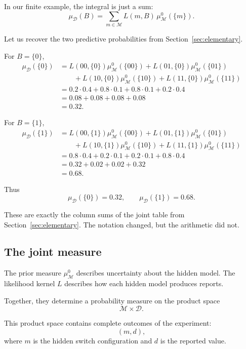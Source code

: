 \documentclass[11pt]{article}
\newcommand{\M}{\mathcal{M}}
\newcommand{\D}{\mathcal{D}}
\newcommand{\muMzero}{\mu^0_{\M}}
\newcommand{\muD}{\mu_{\D}}
\begin{document}
In our finite example, the integral is just a sum:
\[
    \muD(B)
    =
    \sum_{m\in\M} L(m,B)\,\muMzero(\{m\}).
\]

Let us recover the two predictive probabilities from Section~\ref{sec:elementary}.

For \(B=\{0\}\),
\[
\begin{aligned}
    \muD(\{0\})
    &=
    L(00,\{0\})\muMzero(\{00\})
    +
    L(01,\{0\})\muMzero(\{01\})
    \\
    &\qquad
    +
    L(10,\{0\})\muMzero(\{10\})
    +
    L(11,\{0\})\muMzero(\{11\})
    \\
    &=
    0.2\cdot 0.4
    +
    0.8\cdot 0.1
    +
    0.8\cdot 0.1
    +
    0.2\cdot 0.4
    \\
    &=
    0.08+0.08+0.08+0.08
    \\
    &=
    0.32.
\end{aligned}
\]

For \(B=\{1\}\),
\[
\begin{aligned}
    \muD(\{1\})
    &=
    L(00,\{1\})\muMzero(\{00\})
    +
    L(01,\{1\})\muMzero(\{01\})
    \\
    &\qquad
    +
    L(10,\{1\})\muMzero(\{10\})
    +
    L(11,\{1\})\muMzero(\{11\})
    \\
    &=
    0.8\cdot 0.4
    +
    0.2\cdot 0.1
    +
    0.2\cdot 0.1
    +
    0.8\cdot 0.4
    \\
    &=
    0.32+0.02+0.02+0.32
    \\
    &=
    0.68.
\end{aligned}
\]

Thus
\[
    \muD(\{0\})=0.32,
    \qquad
    \muD(\{1\})=0.68.
\]

These are exactly the column sums of the joint table from Section~\ref{sec:elementary}. The notation changed, but the arithmetic did not.

\subsection{The joint measure}

The prior measure \(\muMzero\) describes uncertainty about the hidden model. The likelihood kernel \(L\) describes how each hidden model produces reports.

Together, they determine a probability measure on the product space
\[
    \M\times\D.
\]

This product space contains complete outcomes of the experiment:
\[
    (m,d),
\]
where \(m\) is the hidden switch configuration and \(d\) is the reported value.
\end{document}
